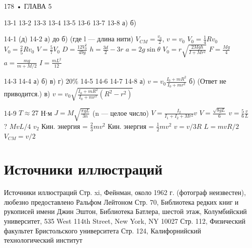 \documentclass[10pt,oneside]{article}
\begin{document}
178 • ГЛАВА 5\par

13-1 13-2 13-3 13-4 13-5 13-6 13-7 13-8 а) б)\par

14-1 (д) 14-2 а) до б) (где l --- длина нити) \(V_{CM} = \frac{v_0}{2}\), \(v = v_0\) \(V_0 = \frac{1}{4} R v_0\) \(V_0 = \frac{2}{5} R v_0\) \(V = \frac{5}{7} V_0\) \(D = \frac{12 V_0^2}{49 g}\) \(h = \frac{3d}{2} - 3r\) \(a = 2g \sin \theta\) \(V_0 = r \sqrt{\frac{2Mgh}{I + Mr^2}}\) \(F = \frac{Mg}{4}\) \(a = \frac{mg}{m + M/2}\) \(I = \frac{mL^2}{12}\)\par

14-3 14-4 а) б) в) г) 20\% 14-5 14-6 14-7 14-8 а) \(v = v_0 \frac{I_0 + mR^2}{I_0 + mr^2}\) б) (Ответ не приводится.) в) \(v = v_0 \sqrt{\frac{I_0 + mR^2}{I_0 + mr^2} (R^2 - r^2)}\)\par

14-9 \(T \approx 27\) Н\ensuremath{\cdot}м \(J = M \sqrt{\frac{\pi g L}{3 n}}\) (n --- целое число) \(V = \frac{I_2}{I_1 + I_2 + Mr^2} v\) \(V = \frac{\sqrt{8gL}}{6}\) \(v = \frac{5}{6} \frac{v}{L}\)? \(MvL/4\) \(v_2\) Кин. энергия = \(\frac{2}{3} mv^2\) Кин. энергия = \(\frac{1}{2} mv^2\) \(v = v/3R\) \(L = mvR/2\) \(V_{CM} = v/2\)\par

\clearpage
{}
\section*{Источники иллюстраций}
\label{tips-sec-14-источники-иллюстраций}
Источники иллюстраций Стр. xi, Фейнман, около 1962 г. (фотограф неизвестен), любезно предоставлено Ральфом Лейтоном Стр. 70, Библиотека редких книг и рукописей имени Джин Эштон, Библиотека Батлера, шестой этаж, Колумбийский университет, 535 West 114th Street, New York, NY 10027 Стр. 112, Физический факультет Бристольского университета Стр. 124, Калифорнийский технологический институт\par

\clearpage
{}
\end{document}
